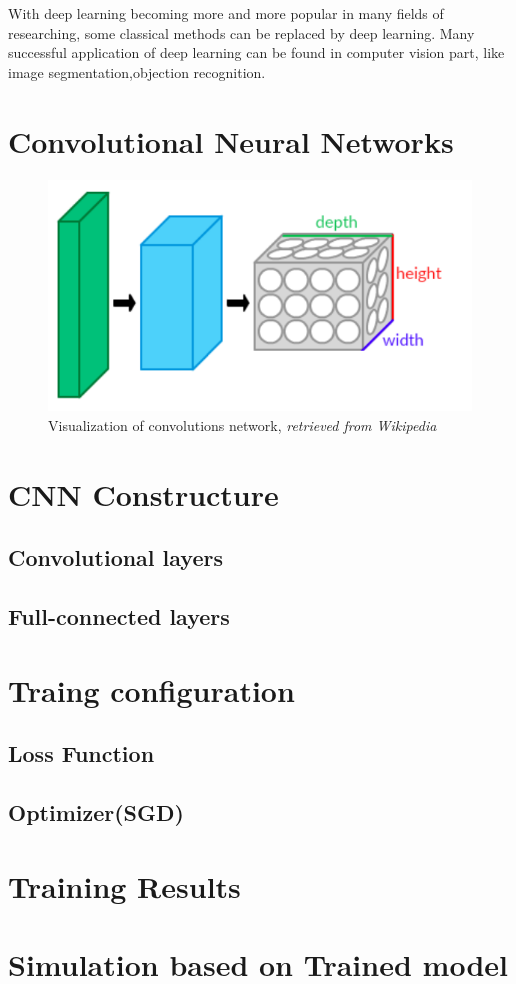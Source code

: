     With deep learning becoming more and more popular in many fields of researching, some classical methods can be replaced by deep learning. Many successful application of deep learning can be found in computer vision part, like image segmentation\cite{lecun2015deep},objection recognition\cite{he2016deep}. 

\section{Convolutional Neural Networks}
    \begin{figure}[!h]
        \centering
        \includegraphics[scale = 0.5]{Figures/Conv_layers.png}
        \caption{Visualization of convolutions network, \textit{retrieved from Wikipedia}}
    \end{figure}

\section{CNN Constructure}
    \subsection{Convolutional layers}

    \subsection{Full-connected layers}

\section{Traing configuration}
    \subsection{Loss Function}
        
    \subsection{Optimizer(SGD)}

\section{Training Results}

\section{Simulation based on Trained model}